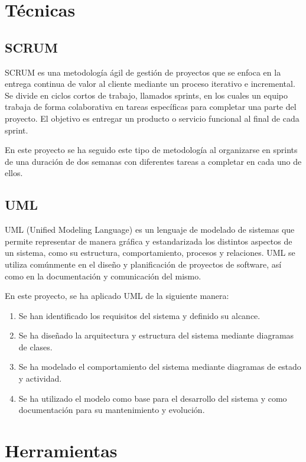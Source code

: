 
\section{Técnicas}

\subsection{SCRUM}
SCRUM es una metodología ágil de gestión de proyectos que se enfoca en la entrega continua de valor al cliente mediante un proceso iterativo e incremental. Se divide en ciclos cortos de trabajo, llamados sprints, en los cuales un equipo trabaja de forma colaborativa en tareas específicas para completar una parte del proyecto. El objetivo es entregar un producto o servicio funcional al final de cada sprint. \cite{wiki:scrum}

En este proyecto se ha seguido este tipo de metodología al organizarse en sprints de una duración de dos semanas con diferentes tareas a completar en cada uno de ellos.

\subsection{UML}
UML (Unified Modeling Language) es un lenguaje de modelado de sistemas que permite representar de manera gráfica y estandarizada los distintos aspectos de un sistema, como su estructura, comportamiento, procesos y relaciones. UML se utiliza comúnmente en el diseño y planificación de proyectos de software, así como en la documentación y comunicación del mismo. \cite{wiki:uml}

En este proyecto, se ha aplicado UML de la siguiente manera: 

\begin{enumerate}
    \item Se han identificado los requisitos del sistema y definido su alcance.
    \item Se ha diseñado la arquitectura y estructura del sistema mediante diagramas de clases.
    \item Se ha modelado el comportamiento del sistema mediante diagramas de estado y actividad.
    \item Se ha utilizado el modelo como base para el desarrollo del sistema y como documentación para su mantenimiento y evolución.
\end{enumerate}

\section{Herramientas}

